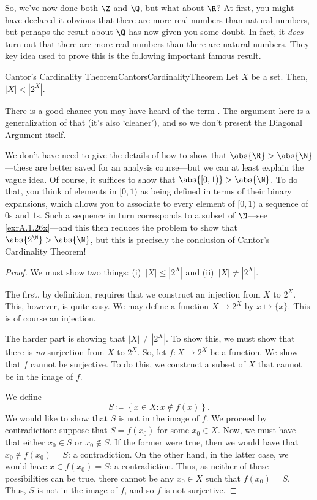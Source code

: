 So, we've now done both $\Z$ and $\Q$, but what about $\R$?  At first, you might have declared it obvious that there are more real numbers than natural numbers, but perhaps the result about $\Q$ has now given you some doubt.  In fact, it \emph{does} turn out that there are more real numbers than there are natural numbers.  They key idea used to prove this is the following important famous result.
\begin{thm}{Cantor's Cardinality Theorem}{CantorsCardinalityTheorem}
	Let $X$ be a set.  Then, $|X|<|2^X|$.
	\begin{rmk}
		There is a good chance you may have heard of the term .  The argument here is a generalization of that (it's also `cleaner'), and so we don't present the Diagonal Argument itself.
	\end{rmk}
	\begin{rmk}
		We don't have need to give the details of how to show that $\abs{\R}>\abs{\N}$---these are better saved for an analysis course---but we can at least explain the vague idea.
		Of course, it suffices to show that $\abs{[0,1)}>\abs{\N}$.  To do that, you think of elements in $[0,1)$ as being defined in terms of their binary expansions, which allows you to associate to every element of $[0,1)$ a sequence of $0$s and $1$s.  Such a sequence in turn corresponds to a subset of $\N$---see \cref{exrA.1.26x}---and this then reduces the problem to show that $\abs{2^{\N}}>\abs{\N}$, but this is precisely the conclusion of Cantor's Cardinality Theorem!
	\end{rmk}
	\begin{proof}
		We must show two things:  (i)~$|X|\leq |2^X|$ and (ii)~$|X|\neq |2^X|$.
		
		The first, by definition, requires that we construct an injection from $X$ to $2^X$.  This, however, is quite easy.  We may define a function $X\rightarrow 2^X$ by $x\mapsto \{ x\}$.  This is of course an injection.
		
		The harder part is showing that $|X|\neq |2^X|$.  To show this, we must show that there is \emph{no} surjection from $X$ to $2^X$.  So, let $f\colon X\rightarrow 2^X$ be a function.  We show that $f$ cannot be surjective.  To do this, we construct a subset of $X$ that cannot be in the image of $f$.
		
		We define
		\begin{equation}
		S\coloneqq \left\{ x\in X:x\notin f(x)\right\} .
		\end{equation}
		We would like to show that $S$ is not in the image of $f$.  We proceed by contradiction:  suppose that $S=f(x_0)$ for some $x_0\in X$.  Now, we must have that either $x_0\in S$ or $x_0\notin S$.  If the former were true, then we would have that $x_0\notin f(x_0)=S$:  a contradiction.  On the other hand, in the latter case, we would have $x\in f(x_0)=S$:  a contradiction.  Thus, as neither of these possibilities can be true, there cannot be any $x_0\in X$ such that $f(x_0)=S$.  Thus, $S$ is not in the image of $f$, and so $f$ is not surjective.
	\end{proof}
\end{thm}

